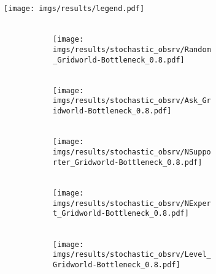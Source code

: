 \begin{figure}[!tbh]
    \centering
    \texttt{[image: imgs/results/legend.pdf]}
    \\[3pt]
    \begin{subfigure}{\linewidth}
    \hfill
    \begin{subfigure}[b]{0.155\linewidth}
        \centering
        \\
        \texttt{[image: imgs/results/stochastic\_obsrv/Random\_Gridworld-Bottleneck\_0.8.pdf]}
    \end{subfigure} 
    \hfill
        \begin{subfigure}[b]{0.155\linewidth}
        \centering
        \\
        \texttt{[image: imgs/results/stochastic\_obsrv/Ask\_Gridworld-Bottleneck\_0.8.pdf]}
    \end{subfigure} 
    \hfill
        \begin{subfigure}[b]{0.155\textwidth}
        \centering
        \\
        \texttt{[image: imgs/results/stochastic\_obsrv/NSupporter\_Gridworld-Bottleneck\_0.8.pdf]}
    \end{subfigure} 
    \hfill
    \begin{subfigure}[b]{0.155\textwidth}
        \centering
        \\
        \texttt{[image: imgs/results/stochastic\_obsrv/NExpert\_Gridworld-Bottleneck\_0.8.pdf]}
    \end{subfigure} 
    \hfill
    \begin{subfigure}[b]{0.155\textwidth}
        \centering
        \\
        \texttt{[image: imgs/results/stochastic\_obsrv/Level\_Gridworld-Bottleneck\_0.8.pdf]}
    \end{subfigure} 
    \hfill
    \begin{subfigure}[b]{0.155\textwidth}
        \centering

\end{subfigure}
\end{subfigure}
\end{figure}
